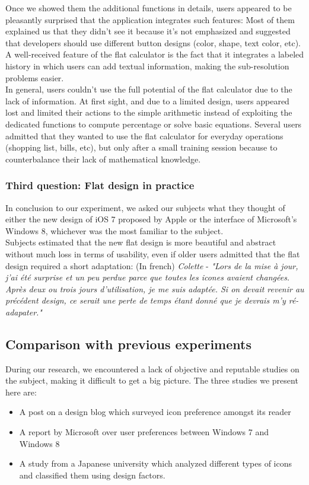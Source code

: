 \documentclass[a4paper,11pt] {article}
\theoremstyle{definition}
\begin{document}
    Once we showed them the additional functions in details, users appeared to be pleasantly surprised that the application integrates such features: Most of them explained us that they didn't see it because it's not emphasized and suggested that developers should use different button designs (color, shape, text color, etc). A well-received feature of the flat calculator is the fact that it integrates a labeled history in which users can add textual information, making the sub-resolution problems easier.\\

    In general, users couldn't use the full potential of the flat calculator due to the lack of information. At first sight, and due to a limited design, users appeared lost and limited their actions to the simple arithmetic instead of exploiting the dedicated functions to compute percentage or solve basic equations. Several users admitted that they wanted to use the flat calculator for everyday operations (shopping list, bills, etc), but only after a small training session because to counterbalance their lack of mathematical knowledge.\\

    \subsubsection{Third question: Flat design in practice}
    In conclusion to our experiment, we asked our subjects what they thought of either the new design of iOS 7 proposed by Apple or the interface of Microsoft's Windows 8, whichever was the most familiar to the subject.\\

    Subjects estimated that the new flat design is more beautiful and abstract without much loss in terms of usability, even if older users admitted that the flat design required a short adaptation:
  	(In french) \textit{Colette} - \textit{"Lors de la mise à jour, j'ai été surprise et un peu perdue parce que toutes les icones avaient changées. Après deux ou trois jours d'utilisation, je me suis adaptée. Si on devait revenir au précédent design, ce serait une perte de temps étant donné que je devrais m'y ré-adapater."}

    \subsection{Comparison with previous experiments}

    During our research, we encountered a lack of objective and reputable studies on the subject, making it difficult to get a big picture. The three studies we present here are:
    \begin{itemize}
        \item A post on a design blog which surveyed icon preference amongst its reader
        \item A report by Microsoft over user preferences between Windows 7 and Windows 8
        \item A study from a Japanese university which analyzed different types of icons and classified them using design factors.
    \end{itemize}
\end{document}
